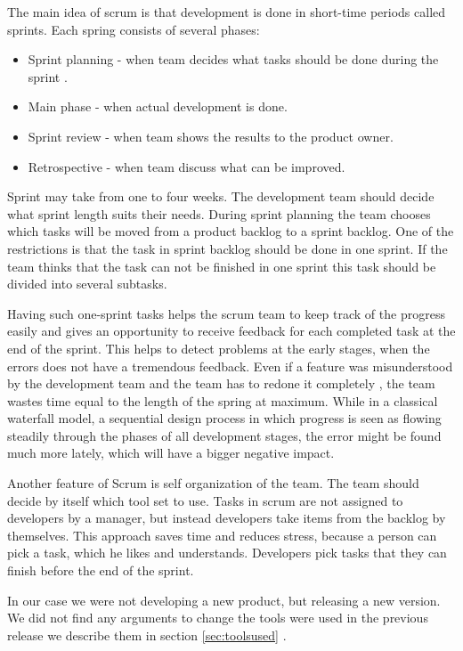   The main idea of scrum is that development is done in short-time periods
  called sprints. Each spring consists of several phases:
  \begin{itemize}
    \item  Sprint planning - when team decides what tasks should be done during the
  sprint .
  \item   Main phase - when actual development is done.
  \item Sprint review - when team shows the results to the product owner.
  \item Retrospective - when team discuss what can be improved.
  \end{itemize}
 
  Sprint may take from one to four weeks. The development team should decide
  what sprint length suits their needs. During sprint planning the team chooses
  which tasks will be moved from a product backlog to a sprint backlog.
  One of the restrictions is that the task in sprint backlog should be done in one sprint.
  If the team thinks that the task can not be finished in one sprint this task
  should be divided into several subtasks. 
  
  Having such one-sprint tasks helps the scrum team to keep track of the
  progress easily and gives an opportunity to receive feedback for each
  completed task at the end of the sprint. This helps to detect problems at the early stages, when
  the errors does not have a tremendous feedback.
  Even if a feature was misunderstood by the development team
  and the team  has to redone it completely , the team wastes time equal to the
  length of the spring at maximum. While in a classical waterfall model,
   a sequential design process in which progress is seen as flowing steadily through 
   the phases of all development stages, 
  the error might be found much more lately, which will have a bigger negative impact.

  Another feature of Scrum is self organization of the team. The team should
  decide by itself which tool set to use. Tasks in scrum are not assigned to
  developers by a manager, but instead developers take items from the backlog by themselves.
  This approach saves time and reduces stress, because a person can pick a task,
  which he likes and understands. Developers pick tasks that they
  can finish before the end of the sprint.

  In our case we were not developing a new product, but releasing a new version.
  We did not find any arguments to change the tools were used in the previous
  release we describe them in section \ref{sec:toolsused} .

